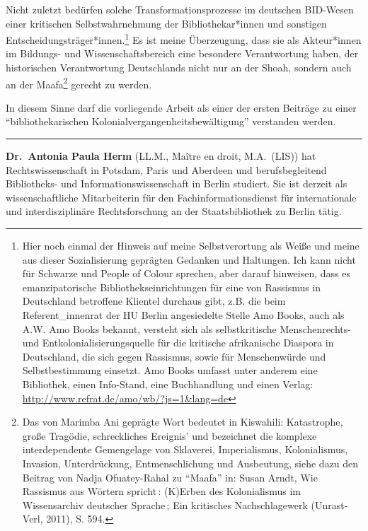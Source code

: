 \documentclass[a4paper,
fontsize=11pt,
oneside,
numbers=noperiodatend,
parskip=half-,
bibliography=totoc,
final
]{scrartcl}
\begin{document}
Nicht zuletzt bedürfen solche Transformationsprozesse im deutschen
BID-Wesen einer kritischen Selbstwahrnehmung der Bibliothekar*innen und
sonstigen Entscheidungsträger*innen.\footnote{Hier noch einmal der
  Hinweis auf meine Selbstverortung als Weiße und meine aus dieser
  Sozialisierung geprägten Gedanken und Haltungen. Ich kann nicht für
  Schwarze und People of Colour sprechen, aber darauf hinweisen, dass es
  emanzipatorische Bibliothekseinrichtungen für eine von Rassismus in
  Deutschland betroffene Klientel durchaus gibt, z.B. die beim
  Referent\_innenrat der HU Berlin angesiedelte Stelle Amo Books, auch
  als A.W. Amo Books bekannt, versteht sich als selbstkritische
  Menschenrechts- und Entkolonialisierungsquelle für die kritische
  afrikanische Diaspora in Deutschland, die sich gegen Rassismus, sowie
  für Menschenwürde und Selbstbestimmung einsetzt. Amo Books umfasst
  unter anderem eine Bibliothek, einen Info-Stand, eine Buchhandlung und
  einen Verlag: \url{http://www.refrat.de/amo/wb/?js=1\&lang=de}} Es ist
meine Überzeugung, dass sie als Akteur*innen im Bildungs- und
Wissenschaftsbereich eine besondere Verantwortung haben, der
historischen Verantwortung Deutschlands nicht nur an der Shoah, sondern
auch an der Maafa\footnote{Das von Marimba Ani geprägte Wort bedeutet in
  Kiswahili: Katastrophe, große Tragödie, schreckliches Ereignis' und
  bezeichnet die komplexe interdependente Gemengelage von Sklaverei,
  Imperialismus, Kolonialismus, Invasion, Unterdrückung,
  Entmenschlichung und Ausbeutung, siehe dazu den Beitrag von Nadja
  Ofuatey-Rahal zu \enquote{Maafa} in: Susan Arndt, Wie Rassismus aus
  Wörtern spricht\,: (K)Erben des Kolonialismus im Wissensarchiv
  deutscher Sprache\,; Ein kritisches Nachschlagewerk (Unrast-Verl,
  2011), S. 594.} gerecht zu werden.

In diesem Sinne darf die vorliegende Arbeit als einer der ersten
Beiträge zu einer \enquote{bibliothekarischen
Kolonialvergangenheitsbewältigung} verstanden werden.

\begin{center}\rule{0.5\linewidth}{0.5pt}\end{center}

\textbf{Dr.~Antonia Paula Herm} (LL.M., Maître en droit, M.A.~(LIS)) hat
Rechtswissenschaft in Potsdam, Paris und Aberdeen und berufsbegleitend
Bibliotheks- und Informationswissenschaft in Berlin studiert. Sie ist
derzeit als wissenschaftliche Mitarbeiterin für den
Fachinformationsdienst für internationale und interdisziplinäre
Rechtsforschung an der Staatsbibliothek zu Berlin tätig.
\end{document}
